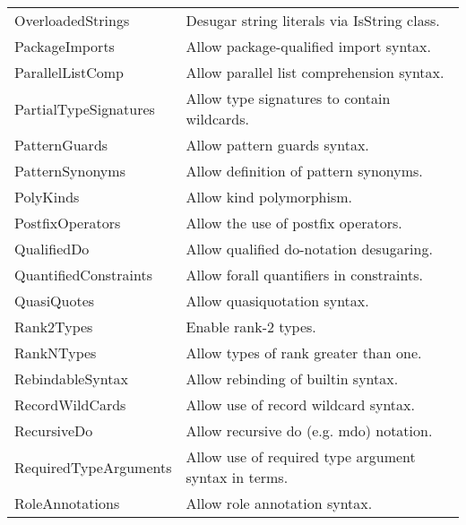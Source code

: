\documentclass[openany, 12pt]{book}
\begin{document}
\begin{longtable}{ll}
	OverloadedStrings          & Desugar string literals via IsString class.                                \\
	PackageImports             & Allow package-qualified import syntax.                                     \\
	ParallelListComp           & Allow parallel list comprehension syntax.                                  \\
	PartialTypeSignatures      & Allow type signatures to contain wildcards.                                \\
	PatternGuards              & Allow pattern guards syntax.                                               \\
	PatternSynonyms            & Allow definition of pattern synonyms.                                      \\
	PolyKinds                  & Allow kind polymorphism.                                                   \\
	PostfixOperators           & Allow the use of postfix operators.                                        \\
	QualifiedDo                & Allow qualified do-notation desugaring.                                    \\
	QuantifiedConstraints      & Allow forall quantifiers in constraints.                                   \\
	QuasiQuotes                & Allow quasiquotation syntax.                                               \\
	Rank2Types                 & Enable rank-2 types.                                                       \\
	RankNTypes                 & Allow types of rank greater than one.                                      \\
	RebindableSyntax           & Allow rebinding of builtin syntax.                                         \\
	RecordWildCards            & Allow use of record wildcard syntax.                                       \\
	RecursiveDo                & Allow recursive do (e.g. mdo) notation.                                    \\
	RequiredTypeArguments      & Allow use of required type argument syntax in terms.                       \\
	RoleAnnotations            & Allow role annotation syntax.                                              \\

\end{longtable}
\end{document}
